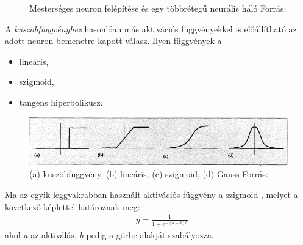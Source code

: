 \documentclass[12pt,a4]{article}
\begin{document}
	
	\begin{figure}[h]%
		\centering
		\qquad
		\caption{Mesterséges neuron felépítése és egy többrétegű neurális háló \newline\centering Forrás: \cite{ann}}%
		\label{fig:fig2}%
	\end{figure}
	\newpage
	A \textit{küszöbfüggvényhez} hasonlóan más aktivációs függvényekkel is előállítható az adott neuron bemenetre kapott válasz. Ilyen függvények a 
	\begin{itemize}
		\item lineáris,
		\item szigmoid,
		\item tangens hiperbolikusz.
	\end{itemize}

	\begin{figure}[h]	
		\centering
		\includegraphics[width=1\linewidth]{fuggvenyek}
		\caption{(a) küszöbfüggvény, (b) lineáris, (c) szigmoid, (d) Gauss 
			\newline\centering Forrás:\cite{ann2}}
		\label{fuggvenyek}
	\end{figure}
	\clearpage
	\begin{mdframed}
	Ma az egyik leggyakrabban használt aktivációs függvény a szigmoid \cite{ann4}, melyet a következő képlettel határoznak meg:
	\begin{align}
		&y = \frac{1}{1 + e^{-(a - \theta)b}}
	\end{align}
	ahol \textit{a} az aktiválás, \textit{b} pedig a görbe alakját szabályozza.
	\end{mdframed}
	
\end{document}
